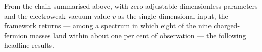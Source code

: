 
From the chain summarised above, with zero adjustable dimensionless parameters and the electroweak
vacuum value $v$ as the single dimensional input, the framework returns --- among a spectrum in
which eight of the nine charged-fermion masses land within about one per cent of observation ---
the following headline results.

